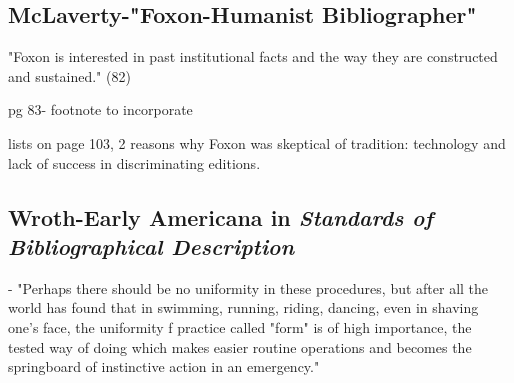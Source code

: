 \documentclass[course, english]{Notes}
\newcommand{\n}{\scalebox{2}{\textbf{\framebox{$\aleph$} } } }
\begin{document}
\subsection{McLaverty-"Foxon-Humanist Bibliographer"}
\begin{outline}
\1 "Foxon is interested in past institutional facts and the way they are constructed and sustained." (82)

\1 \n pg 83- footnote to incorporate

\1 lists on page 103, 2 reasons why Foxon was skeptical of tradition: technology and lack of success in discriminating editions. 
\end{outline}

\subsection{Wroth-Early Americana in \textit{Standards of Bibliographical Description} }
\begin{outline}
- "Perhaps there should be no uniformity in these procedures, but after all the world has found that in swimming, running, riding, dancing, even in shaving one's face, the uniformity f practice called "form" is of high importance, the tested way of doing which makes easier routine operations and becomes the springboard of instinctive action in an emergency."

\1 
\end{outline}
\end{document}
